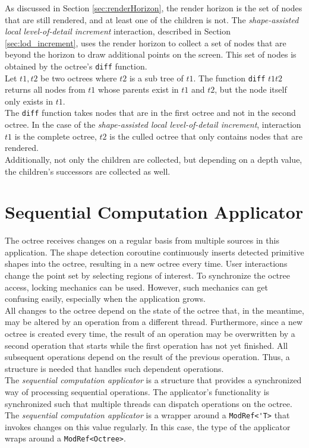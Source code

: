 As discussed in Section \ref{sec:renderHorizon}, the render horizon is the set of nodes that are still rendered, and at least one of the children is not. The \textit{shape-assisted local level-of-detail increment} interaction, described in Section \ref{sec:lod_increment}, uses the render horizon to collect a set of nodes that are beyond the horizon to draw additional points on the screen. This set of nodes is obtained by the octree's \verb|diff| function. 
\\
Let $t1, t2$ be two octrees where $t2$ is a sub tree of $t1$. The function \verb|diff| $t1 t2$ returns all nodes from $t1$ whose parents exist in $t1$ and $t2$, but the node itself only exists in $t1$.
\\
The \verb|diff| function takes nodes that are in the first octree and not in the second octree. In the case of the \textit{shape-assisted local level-of-detail increment}, interaction $t1$ is the complete octree, $t2$ is the culled octree that only contains nodes that are rendered. 
\\
Additionally, not only the children are collected, but depending on a depth value, the children's successors are collected as well. 


\section{Sequential Computation Applicator}

The octree receives changes on a regular basis from multiple sources in this application. The shape detection coroutine continuously inserts detected primitive shapes into the octree, resulting in a new octree every time. User interactions change the point set by selecting regions of interest. To synchronize the octree access, locking mechanics can be used. However, such mechanics can get confusing easily, especially when the application grows. 
\\
All changes to the octree depend on the state of the octree that, in the meantime, may be altered by an operation from a different thread. Furthermore, since a new octree is created every time, the result of an operation may be overwritten by a second operation that starts while the first operation has not yet finished. All subsequent operations depend on the result of the previous operation. Thus, a structure is needed that handles such dependent operations. 
\\
The \textit{sequential computation applicator} is a structure that provides a synchronized way of processing sequential operations. The applicator's functionality is synchronized such that multiple threads can dispatch operations on the octree. The \textit{sequential computation applicator} is a wrapper around a \verb|ModRef<'T>| that invokes changes on this value regularly. 
In this case, the type of the applicator wraps around a \verb|ModRef<Octree>|. 

